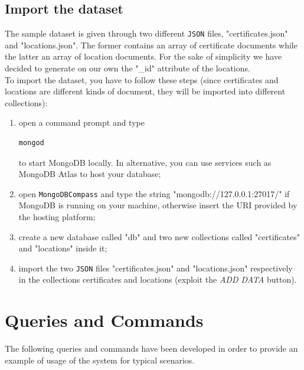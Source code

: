 \documentclass{article}
\begin{document}
\subsection{Import the dataset}\label{import}
The sample dataset is given through two different \verb|JSON| files, "certificates.json" and "locations.json". The former contains an array of certificate documents while the latter an array of location documents. For the sake of simplicity we have decided to generate on our own the "\_id" attribute of the locations.\\
To import the dataset, you have to follow these steps (since certificates and locations are different kinds of document, they will be imported into different collections):
\begin{enumerate}
    \item open a command prompt and type \begin{lstlisting}[language=bash]
    mongod
\end{lstlisting}
to start MongoDB locally. In alternative, you can use services such as MongoDB Atlas to host your database;
\item open \verb|MongoDBCompass| and type the string "mongodb://127.0.0.1:27017/" if MongoDB is running on your machine, otherwise insert the URI provided by the hosting platform;
\item create a new database called "db" and two new collections called "certificates" and "locations" inside it;
\item import the two \verb|JSON| files "certificates.json" and "locations.json" respectively in the collections certificates and locations (exploit the \textit{ADD DATA} button).
\end{enumerate}
\section{Queries and Commands}
The following queries and commands have been developed in order to provide an example of usage of the system for typical scenarios.
\end{document}
